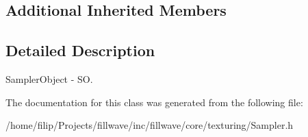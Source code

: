 \subsection*{Additional Inherited Members}


\subsection{Detailed Description}
Sampler\+Object -\/ SO. 

The documentation for this class was generated from the following file\+:\begin{DoxyCompactItemize}
\item 
/home/filip/\+Projects/fillwave/inc/fillwave/core/texturing/Sampler.\+h\end{DoxyCompactItemize}
